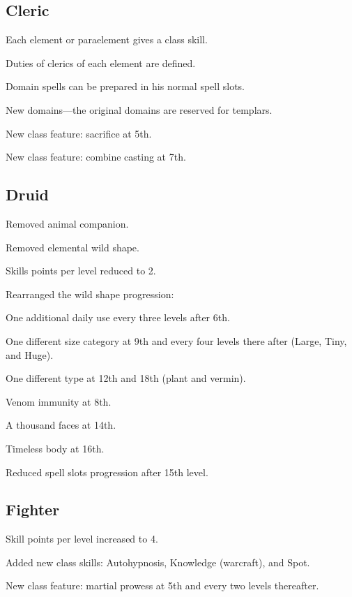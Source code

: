 \subsection{Cleric}
\begin{itemize*}
\item Each element or paraelement gives a class skill.
\item Duties of clerics of each element are defined.
\item Domain spells can be prepared in his normal spell slots.
\item New domains---the original domains are reserved for templars.
\item New class feature: sacrifice at 5th.
\item New class feature: combine casting at 7th.
\end{itemize*}

\subsection{Druid}
\begin{itemize*}
\item Removed animal companion.%
\item Removed elemental wild shape.
\item Skills points per level reduced to 2.
\item Rearranged the wild shape progression:
	\begin{itemize*}
	 	\item One additional daily use every three levels after 6th.
	 	\item One different size category at 9th and every four levels there after (Large, Tiny, and Huge).
	 	\item One different type at 12th and 18th (plant and vermin).
 	\end{itemize*}
\item Venom immunity at 8th.
\item A thousand faces at 14th.
\item Timeless body at 16th.
\item Reduced spell slots progression after 15th level.
\end{itemize*}

\subsection{Fighter}
\begin{itemize*}
\item Skill points per level increased to 4.
\item Added new class skills: Autohypnosis, Knowledge (warcraft), and Spot.
\item New class feature: martial prowess at 5th and every two levels thereafter.
\end{itemize*}

